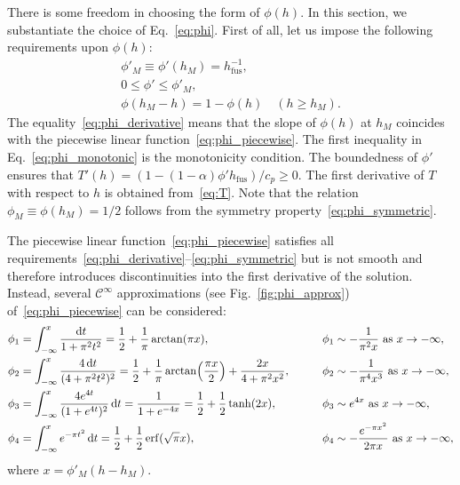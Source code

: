 \documentclass{article}
\newcommand{\fusion}[1]{{#1}_\mathrm{fus}}
\begin{document}
There is some freedom in choosing the form of $\phi(h)$.
In this section, we substantiate the choice of Eq.~\eqref{eq:phi}.
First of all, let us impose the following requirements upon $\phi(h)$:
\begin{gather}
    \phi'_M \equiv \phi'(h_M) = \fusion{h}^{-1}, \label{eq:phi_derivative}\\
    0 \leq \phi' \leq \phi'_M, \label{eq:phi_monotonic}\\
    \phi(h_M - h) = 1-\phi(h) \quad (h\geq h_M). \label{eq:phi_symmetric}
\end{gather}
The equality~\eqref{eq:phi_derivative} means that the slope of $\phi(h)$ at $h_M$
coincides with the piecewise linear function~\eqref{eq:phi_piecewise}.
The first inequality in Eq.~\eqref{eq:phi_monotonic} is the monotonicity condition.
The boundedness of $\phi'$ ensures that $T'(h) = (1-(1-\alpha)\phi'\fusion{h})/c_p \geq 0$.
The first derivative of $T$ with respect to $h$ is obtained from~\eqref{eq:T}.
Note that the relation $\phi_M \equiv \phi(h_M) = 1/2$ follows from the symmetry property~\eqref{eq:phi_symmetric}.

The piecewise linear function~\eqref{eq:phi_piecewise} satisfies all
requirements~\eqref{eq:phi_derivative}--\eqref{eq:phi_symmetric}
but is not smooth and therefore introduces discontinuities
into the first derivative of the solution.
Instead, several $\mathcal{C}^\infty$ approximations (see Fig.~\ref{fig:phi_approx})
of~\eqref{eq:phi_piecewise} can be considered:
\begin{alignat}{2}
    \phi_1 &= \int_{-\infty}^{x} \frac{\dd{t}}{1+\pi^2 t^2}
        = \frac12 + \frac1\pi\arctan(\pi x), \qquad
        &\phi_1 &\sim -\frac1{\pi^2x} \text{ as } x\to-\infty, \label{eq:phi1}\\
    \phi_2 &= \int_{-\infty}^{x} \frac{4\dd{t}}{(4+\pi^2 t^2)^2}
        = \frac12 + \frac1\pi\arctan(\frac{\pi x}2) + \frac{2x}{4+\pi^2x^2}, \qquad
        &\phi_2 &\sim -\frac1{\pi^4x^3} \text{ as } x\to-\infty, \label{eq:phi2}\\
    \phi_3 &= \int_{-\infty}^{x} \frac{4e^{4t}}{(1+e^{4t})^2}\dd{t}
        = \frac1{1+e^{-4x}} = \frac12 + \frac12\tanh(2x), \qquad
        &\phi_3 &\sim e^{4x} \text{ as } x\to-\infty, \label{eq:phi3}\\
    \phi_4 &= \int_{-\infty}^{x} e^{-\pi t^2}\dd{t} = \frac12 + \frac12\erf(\sqrt\pi x), \qquad
        &\phi_4 &\sim -\frac{e^{-\pi x^2}}{2\pi x} \text{ as } x\to-\infty, \label{eq:phi4}
\end{alignat}
where $x = \phi'_M(h-h_M)$.
\end{document}
